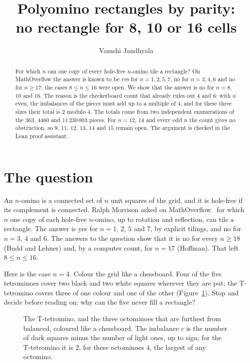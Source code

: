 \documentclass[11pt]{article}
\title{Polyomino rectangles by parity: \\ no rectangle for 8, 10 or 16 cells}
\author{Vamshi Jandhyala}
\date{}
\begin{document}
\maketitle
\vspace{-2em}

\begin{abstract}
For which $n$ can one copy of every hole-free $n$-omino tile a rectangle? On MathOverflow the answer is known to
be yes for $n=1,2,5,7$, no for $n=3,4,6$ and no for $n\ge17$; the cases $8\le n\le16$ were open. We show that the
answer is no for $n=8$, $10$ and $16$. The reason is the checkerboard count that already rules out $4$ and $6$:
with $n$ even, the imbalances of the pieces must add up to a multiple of $4$, and for these three sizes their total is
$2$ modulo $4$. The totals come from two independent enumerations of the $363$, $4460$ and $11\,230\,003$ pieces.
For $n=12$, $14$ and every odd $n$ the count gives no obstruction, so $9$, $11$, $12$, $13$, $14$ and $15$ remain
open. The argument is checked in the Lean proof assistant.
\end{abstract}

\section{The question}

An $n$-omino is a connected set of $n$ unit squares of the grid, and it is hole-free if its complement is
connected. Ralph Morrison asked on MathOverflow~\cite{MO} for which $n$ one copy of each hole-free $n$-omino, up to
rotation and reflection, can tile a rectangle. The answer is yes for $n=1$, $2$, $5$ and $7$, by explicit tilings,
and no for $n=3$, $4$ and $6$. The answers to the question show that it is no for every $n\ge18$ (Budd and Lehner)
and, by a computer count, for $n=17$ (Hoffman). That left $8\le n\le 16$.

Here is the case $n=4$. Colour the grid like a chessboard. Four of the five tetrominoes cover two black and two
white squares wherever they are put; the T-tetromino covers three of one colour and one of the other
(Figure~\ref{fig:pieces}). Stop and decide before reading on: why can the five never fill a rectangle?

\begin{figure}[ht]
\centering

\caption{The T-tetromino, and the three octominoes that are furthest from balanced, coloured like a chessboard.
The imbalance $c$ is the number of dark squares minus the number of light ones, up to sign; for the T-tetromino it is
$2$, for these octominoes $4$, the largest of any octomino.}
\label{fig:pieces}
\end{figure}
\end{document}
